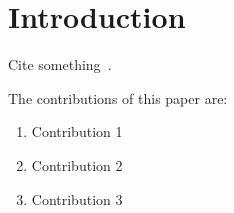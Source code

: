\section{Introduction}

Cite something~\cite{li:simbricks}.

The contributions of this paper are:

\begin{enumerate}
  \item Contribution 1
  \item Contribution 2
  \item Contribution 3
\end{enumerate}
